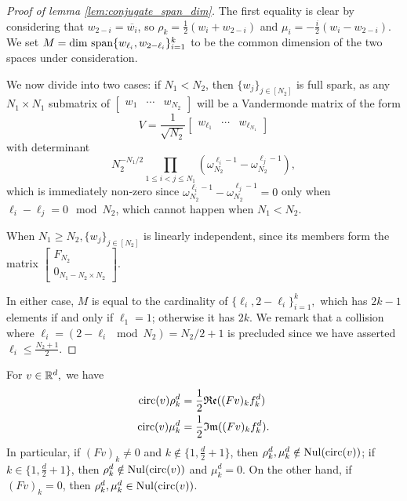 \begin{proof}[Proof of lemma \ref{lem:conjugate_span_dim}]

The first equality is clear by considering that $w_{2 - i} = \overline{w_i}$, so $\rho_k = \frac{1}{2}(w_i + w_{2-i})$ and $\mu_i = -\frac{i}{2}(w_i - w_{2 - i})$.  We set $M = \dim\,\operatorname{span}\{w_{\ell_i}, w_{2 - \ell_i}\}_{i = 1}^k$ to be the common dimension of the two spaces under consideration.

We now divide into two cases: if $N_1 < N_2$, then $\{w_j\}_{j \in [N_2]}$ is full spark, as any $N_1 \times N_1$ submatrix of $\begin{bmatrix} w_1 & \cdots & w_{N_2} \end{bmatrix}$ will be a Vandermonde matrix of the form \[V = \frac{1}{\sqrt{N_2}}\begin{bmatrix} w_{\ell_1} & \cdots & w_{\ell_{N_1}} \end{bmatrix}\] with determinant \[N_2^{-N_1 / 2}\prod_{1 \le i < j \le N_1} (\omega_{N_2}^{\ell_i - 1} - \omega_{N_2}^{\ell_j - 1}),\] which is immediately non-zero since $\omega_{N_2}^{\ell_i - 1} - \omega_{N_2}^{\ell_j - 1} = 0$ only when $\ell_i - \ell_j = 0 \mod N_2$, which cannot happen when $N_1 < N_2$.

When $N_1 \ge N_2, \{w_j\}_{j \in [N_2]}$ is linearly independent, since its members form the matrix $\begin{bmatrix} F_{N_2} \\ 0_{N_1 - N_2 \times N_2} \end{bmatrix}$.

In either case, $M$ is equal to the cardinality of $\{\ell_i, 2 - \ell_i\}_{i = 1}^k,$ which has $2k - 1$ elements if and only if $\ell_1 = 1$; otherwise it has $2k$.  We remark that a collision where $\ell_i = (2 - \ell_i \mod N_2) = N_2 / 2 + 1$ is precluded since we have asserted $\ell_i \le \frac{N_2 + 1}{2}$.

\end{proof}

\begin{lemma}
  For $v \in \mathbb{R}^d,$ we have \begin{align} \operatorname{circ}(v) \rho_k^d &= \frac{1}{2}\mathfrak{Re}((Fv)_k f_k^d) \label{eq:real_part} \\ \operatorname{circ}(v) \mu_k^d &= \frac{1}{2}\mathfrak{Im}((Fv)_k f_k^d) \label{eq:imag_part}. \end{align} In particular, if $(Fv)_k \neq 0$ and $k \notin \{1, \frac{d}{2} + 1\}$, then $\rho_k^d, \mu_k^d \notin \operatorname{Nul}(\operatorname{circ}(v))$; if $k \in \{1, \frac{d}{2} + 1\}$, then $\rho_k^d \notin \operatorname{Nul}(\operatorname{circ}(v))$ and $\mu_k^d = 0$.  On the other hand, if $(Fv)_k = 0$, then $\rho_k^d, \mu_k^d \in \operatorname{Nul}(\operatorname{circ}(v))$.  \label{lem:eigenbits}
\end{lemma}

